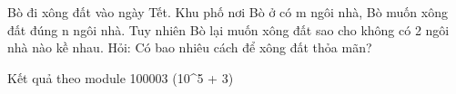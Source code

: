 Bò đi xông đất vào ngày Tết. Khu phố nơi Bò ở có m ngôi nhà, Bò muốn xông đất đúng n ngôi nhà. Tuy nhiên Bò lại muốn xông đất sao cho không có 2 ngôi nhà nào kề nhau. Hỏi: Có bao nhiêu cách để xông đất thỏa mãn?

Kết quả theo module 100003 (10^5 + 3)